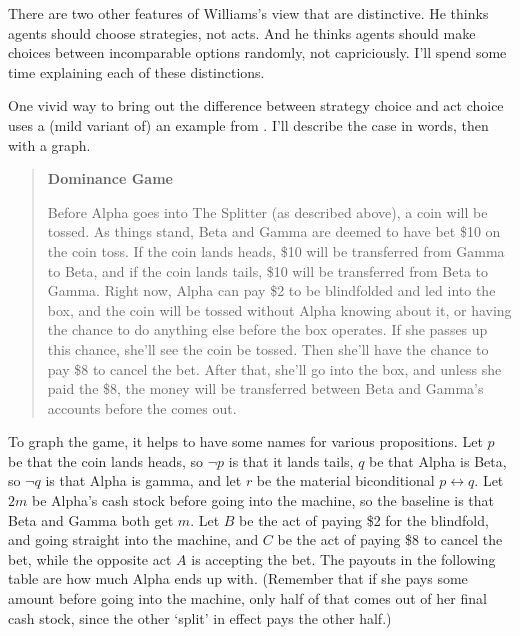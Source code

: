 There are two other features of Williams's view that are distinctive. He thinks agents should choose strategies, not acts. And he thinks agents should make choices between incomparable options randomly, not capriciously. I'll spend some time explaining each of these distinctions.

One vivid way to bring out the difference between strategy choice and act choice uses a (mild variant of) an example from \citet{Seidenfeld1994}. I'll describe the case in words, then with a graph. 

\begin{quote}

\textbf{Dominance Game}

Before Alpha goes into The Splitter (as described above), a coin will be tossed. As things stand, Beta and Gamma are deemed to have bet \$10 on the coin toss. If the coin lands heads, \$10 will be transferred from Gamma to Beta, and if the coin lands tails, \$10 will be transferred from Beta to Gamma. Right now, Alpha can pay \$2 to be blindfolded and led into the box, and the coin will be tossed without Alpha knowing about it, or having the chance to do anything else before the box operates. If she passes up this chance, she'll see the coin be tossed. Then she'll have the chance to pay \$8 to cancel the bet. After that, she'll go into the box, and unless she paid the \$8, the money will be transferred between Beta and Gamma's accounts before the comes out.

\end{quote}

\noindent To graph the game, it helps to have some names for various propositions. Let $p$ be that the coin lands heads, so $\neg p$ is that it lands tails, $q$ be that Alpha is Beta, so $\neg q$ is that Alpha is gamma, and let $r$ be the material biconditional $p \leftrightarrow q$. Let $2m$ be Alpha's cash stock before going into the machine, so the baseline is that Beta and Gamma both get $m$. Let $B$ be the act of paying \$2 for the blindfold, and going straight into the machine, and $C$ be the act of paying \$8 to cancel the bet, while the opposite act $A$ is accepting the bet. The payouts in the following table are how much Alpha ends up with. (Remember that if she pays some amount before going into the machine, only half of that comes out of her final cash stock, since the other `split' in effect pays the other half.)

